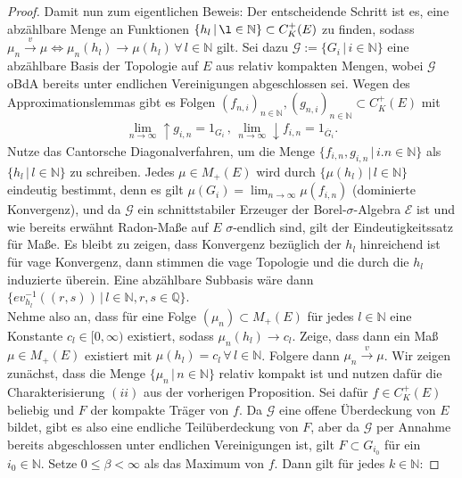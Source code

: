 \documentclass[twoside]{article}
\theoremstyle{definition}
\begin{document}
\begin{proof}
Damit nun zum eigentlichen Beweis: Der entscheidende Schritt ist es, eine abzählbare Menge an Funktionen $\{h_l\, | \, \l \in \mathbb{N}\} \subset C_K^+(E)$ zu finden, sodass $\mu_n \xrightarrow{v} \mu \Longleftrightarrow \mu_n(h_l) \to \mu(h_l) \, \forall \, l \in \mathbb{N}$ gilt. Sei dazu $\mathcal{G} := \{ G_i \, | \, i \in \mathbb{N} \}$ eine abzählbare Basis der Topologie auf $E$ aus relativ kompakten Mengen, wobei $\mathcal{G}$ oBdA bereits unter endlichen Vereinigungen abgeschlossen sei. Wegen des Approximationslemmas gibt es Folgen $(f_{n,i})_{n \in \mathbb{N}}, (g_{n,i})_{n \in \mathbb{N}} \subset C_K^+(E)$ mit
\begin{align}
\lim_{n \to \infty} \uparrow g_{i,n} = 1_{G_i} \, , \, \lim_{n \to \infty} \downarrow f_{i,n} = 1_{\overline{G}_i}.
\end{align}
Nutze das Cantorsche Diagonalverfahren, um die Menge $ \{f_{i,n}, g_{i,n} \, | \, i.n \in \mathbb{N} \}$ als $\{h_l \, | \, l \in \mathbb{N} \}$ zu schreiben. Jedes $\mu \in M_+(E)$ wird durch $\{\mu(h_l) \, | \, l \in \mathbb{N}\}$ eindeutig bestimmt, denn es gilt $\mu(G_i) = \lim_{n \to \infty} \mu(f_{i,n})$ (dominierte Konvergenz), und da $\mathcal{G}$ ein schnittstabiler Erzeuger der Borel-$\sigma$-Algebra $\mathcal{E}$ ist und wie bereits erwähnt Radon-Maße auf $E$ $\sigma$-endlich sind, gilt der Eindeutigkeitssatz für Maße. Es bleibt zu zeigen, dass Konvergenz bezüglich der $h_l$ hinreichend ist für vage Konvergenz, dann stimmen die vage Topologie und die durch die $h_l$ induzierte überein. Eine abzählbare Subbasis wäre dann $\{ev_{h_l}^{-1}((r,s)) \, | \, l \in \mathbb{N}, r,s \in \mathbb{Q}\}$.\\
Nehme also an, dass für eine Folge $(\mu_n) \subset M_+(E)$ für jedes $l \in \mathbb{N}$ eine Konstante $c_l \in [0,\infty)$ existiert, sodass $\mu_n(h_l) \to c_l$. Zeige, dass dann ein Maß $\mu \in M_+(E)$ existiert mit $\mu(h_l) = c_l \, \forall \, l \in \mathbb{N}$. Folgere dann $\mu_n \xrightarrow{v} \mu$. Wir zeigen zunächst, dass die Menge $\{\mu_n \, | \, n \in \mathbb{N} \}$ relativ kompakt ist und nutzen dafür die Charakterisierung $(ii)$ aus der vorherigen Proposition. Sei dafür $f \in C_K^+(E)$ beliebig und $F$ der kompakte Träger von $f$. Da $\mathcal{G}$ eine offene Überdeckung von $E$ bildet, gibt es also eine endliche Teilüberdeckung von $F$, aber da $\mathcal{G}$ per Annahme bereits abgeschlossen unter endlichen Vereinigungen ist, gilt $F \subset G_{i_0}$ für ein $i_0 \in \mathbb{N}$. Setze $0 \leq \beta < \infty$ als das Maximum von $f$. Dann gilt für jedes $k \in \mathbb{N}$:

\end{proof}
\end{document}
